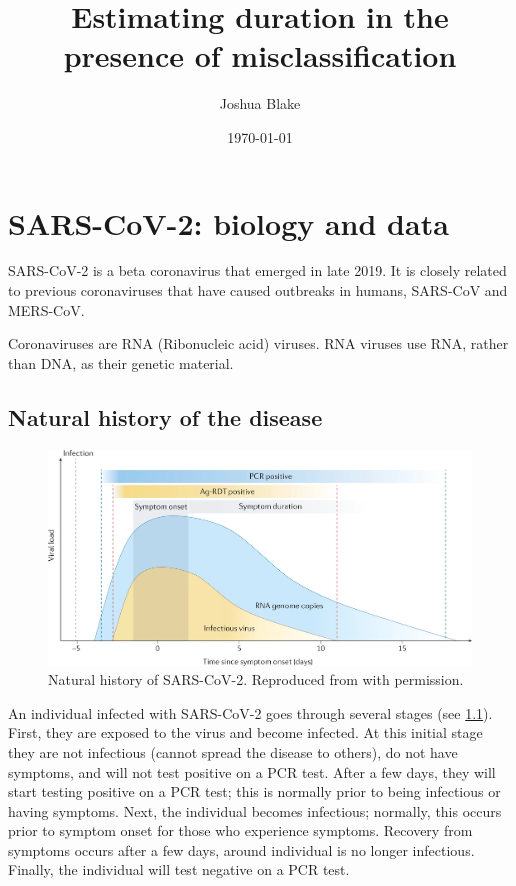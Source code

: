 \documentclass[thesis.tex]{subfiles}
\title{Estimating duration in the presence of misclassification}
\author{Joshua Blake}
\date{\today}
\begin{document}
\ifSubfilesClassLoaded{
  \setcounter{chapter}{1}
}

\chapter{SARS-CoV-2: biology and data} \label{biology-data}


SARS-CoV-2 is a beta coronavirus that emerged in late 2019.
It is closely related to previous coronaviruses that have caused outbreaks in humans, SARS-CoV and MERS-CoV.

Coronaviruses are RNA (Ribonucleic acid) viruses.
RNA viruses use RNA, rather than DNA, as their genetic material.

\section{Natural history of the disease} \label{biology-data:sec:natural-history}

\begin{figure}
  \centering\includegraphics[width=\textwidth]{biology-data/natural-history}
  \caption[Natural history of SARS-CoV-2.]{Natural history of SARS-CoV-2. Reproduced from \textcite{puhachSARSCoV2} with permission.}
  \label{biology-data:fig:natural-history}
\end{figure}

An individual infected with SARS-CoV-2 goes through several stages (see \cref{biology-data:fig:natural-history}).
First, they are exposed to the virus and become infected.
At this initial stage they are not infectious (cannot spread the disease to others), do not have symptoms, and will not test positive on a PCR test.
After a few days, they will start testing positive on a PCR test; this is normally prior to being infectious or having symptoms.
Next, the individual becomes infectious; normally, this occurs prior to symptom onset for those who experience symptoms.
Recovery from symptoms occurs after a few days, around individual is no longer infectious.
Finally, the individual will test negative on a PCR test.
\end{document}
